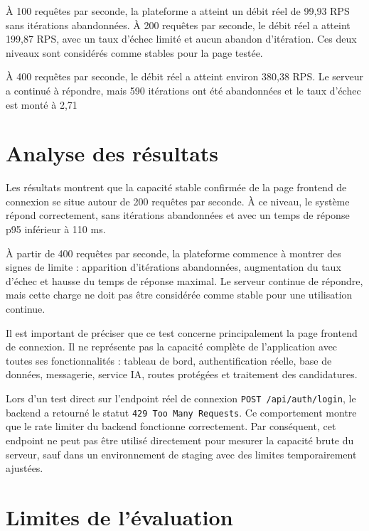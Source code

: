 À 100 requêtes par seconde, la plateforme a atteint un débit réel de 99,93 RPS sans itérations abandonnées. À 200 requêtes par seconde, le débit réel a atteint 199,87 RPS, avec un taux d'échec limité et aucun abandon d'itération. Ces deux niveaux sont considérés comme stables pour la page testée.

À 400 requêtes par seconde, le débit réel a atteint environ 380,38 RPS. Le serveur a continué à répondre, mais 590 itérations ont été abandonnées et le taux d'échec est monté à 2,71%

\section{Analyse des résultats}

Les résultats montrent que la capacité stable confirmée de la page frontend de connexion se situe autour de 200 requêtes par seconde. À ce niveau, le système répond correctement, sans itérations abandonnées et avec un temps de réponse p95 inférieur à 110 ms.

À partir de 400 requêtes par seconde, la plateforme commence à montrer des signes de limite : apparition d'itérations abandonnées, augmentation du taux d'échec et hausse du temps de réponse maximal. Le serveur continue de répondre, mais cette charge ne doit pas être considérée comme stable pour une utilisation continue.

Il est important de préciser que ce test concerne principalement la page frontend de connexion. Il ne représente pas la capacité complète de l'application avec toutes ses fonctionnalités : tableau de bord, authentification réelle, base de données, messagerie, service IA, routes protégées et traitement des candidatures.

Lors d'un test direct sur l'endpoint réel de connexion \texttt{POST /api/auth/login}, le backend a retourné le statut \texttt{429 Too Many Requests}. Ce comportement montre que le rate limiter du backend fonctionne correctement. Par conséquent, cet endpoint ne peut pas être utilisé directement pour mesurer la capacité brute du serveur, sauf dans un environnement de staging avec des limites temporairement ajustées.

\section{Limites de l'évaluation}


